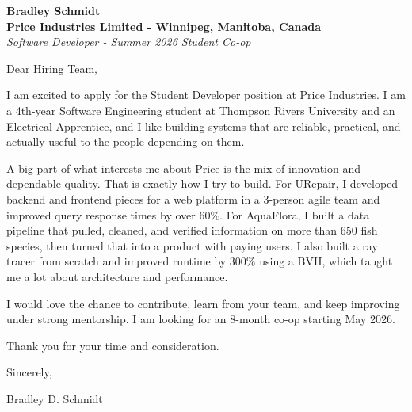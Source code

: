 \documentclass[11pt]{article}
\begin{document}
\textbf{Bradley Schmidt}\\
\vspace{0.5em}
\textbf{Price Industries Limited - Winnipeg, Manitoba, Canada}\\
\textit{Software Developer - Summer 2026 Student Co-op}

Dear Hiring Team,

\par

I am excited to apply for the Student Developer position at Price Industries. I am a 4th-year Software Engineering student at Thompson Rivers University and an Electrical Apprentice, and I like building systems that are reliable, practical, and actually useful to the people depending on them.

\par

A big part of what interests me about Price is the mix of innovation and dependable quality. That is exactly how I try to build. For URepair, I developed backend and frontend pieces for a web platform in a 3-person agile team and improved query response times by over 60\%. For AquaFlora, I built a data pipeline that pulled, cleaned, and verified information on more than 650 fish species, then turned that into a product with paying users. I also built a ray tracer from scratch and improved runtime by 300\% using a BVH, which taught me a lot about architecture and performance.

\par

I would love the chance to contribute, learn from your team, and keep improving under strong mentorship. I am looking for an 8-month co-op starting May 2026.

\par

Thank you for your time and consideration.

\par

Sincerely,

\par

Bradley D. Schmidt
\end{document}
